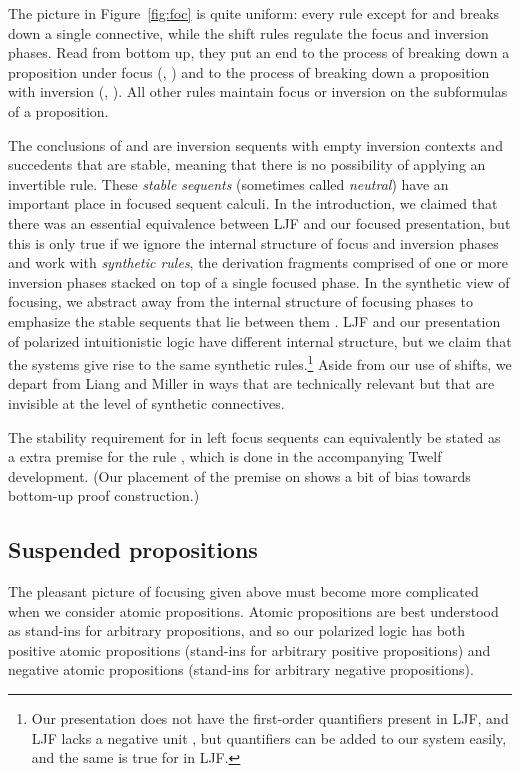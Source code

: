 \documentclass[acmtocl]{robtrans}\pdfoutput=1
\begin{document}
The picture in Figure~\ref{fig:foc} is quite uniform: every rule
except for  and  breaks down a single
connective, while the shift rules regulate the focus and inversion
phases.  Read from bottom up, they put an end to the process of
breaking down a proposition under focus (,
) and to the process of breaking down a proposition with
inversion (, ). All other rules maintain
focus or inversion on the subformulas of a proposition.

The conclusions of  and  are inversion
sequents with empty inversion contexts and succedents  that are
stable, meaning that there is no possibility of applying an invertible
rule.  These {\it stable sequents} (sometimes called {\it neutral})
have an important place in focused sequent calculi.  In the
introduction, we claimed that there was an essential equivalence
between LJF and our focused presentation, but this is only true if we
ignore the internal structure of focus and inversion phases and work
with {\it synthetic rules}, the derivation fragments comprised of one
or more inversion phases stacked on top of a single focused phase. In
the synthetic view of focusing, we abstract away from the internal
structure of focusing phases to emphasize the stable sequents that lie
between them \cite{andreoli01focussing}. LJF and our presentation of
polarized intuitionistic logic have different internal structure, but
we claim that the systems give rise to the same synthetic
rules.\footnote{Our presentation does not have the first-order
  quantifiers present in LJF, and LJF lacks a negative unit ,
  but quantifiers can be added to our system easily, and the same is
  true for  in LJF.} Aside from our use of shifts, we depart
from Liang and Miller in ways that are technically relevant but that
are invisible at the level of synthetic connectives.

The stability requirement for  in left focus sequents
 can equivalently be stated as a extra premise
 for the rule , which is done in the
accompanying Twelf development. (Our placement of the premise on  shows a bit of bias towards bottom-up proof construction.)

\subsection{Suspended propositions}\label{sec:susp}

The pleasant picture of focusing given above must become more
complicated when we
consider atomic propositions. Atomic propositions are best understood
as stand-ins for arbitrary propositions, and so our polarized logic
has both positive atomic propositions (stand-ins for arbitrary
positive propositions) and negative atomic propositions (stand-ins for
arbitrary negative propositions).
\end{document}
